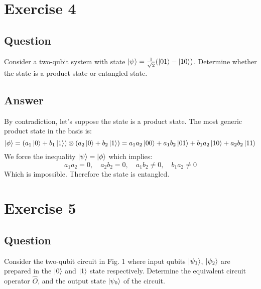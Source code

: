 \documentclass{article}
\begin{document}
\section{Exercise 4}
\subsection{Question}
Consider a two-qubit system with state $\ket{\psi} = \frac{1}{\sqrt{2}}(\ket{01} - \ket{10})$. Determine whether the state is a product state or entangled state.
\subsection{Answer}
By contradiction, let's suppose the state is a product state. The most generic product state in the basis is:
$$\ket{\phi} = (a_1\ket{0}+b_1\ket{1})\otimes (a_2\ket{0}+b_2\ket{1}) = a_1a_2\ket{00}+a_1b_2\ket{01} +b_1a_2\ket{10} + a_2b_2\ket{11}$$
We force the inequality $\ket{\psi} = \ket{\phi}$ which implies:
$$a_1a_2=0,\quad a_2b_2=0,\quad a_1b_2 \ne 0, \quad b_1a_2 \ne 0$$
Which is impossible. Therefore the state is entangled.
\section{Exercise 5}
\subsection{Question}
Consider the two-qubit circuit in Fig. 1  where input qubits $\ket{\psi_1}$, $\ket{\psi_2}$ are prepared in the $\ket{0}$ and $\ket{1}$ state respectively. Determine the equivalent circuit operator $\hat{O}$, and the output state $\ket{\psi_0}$ of the circuit.
\end{document}
